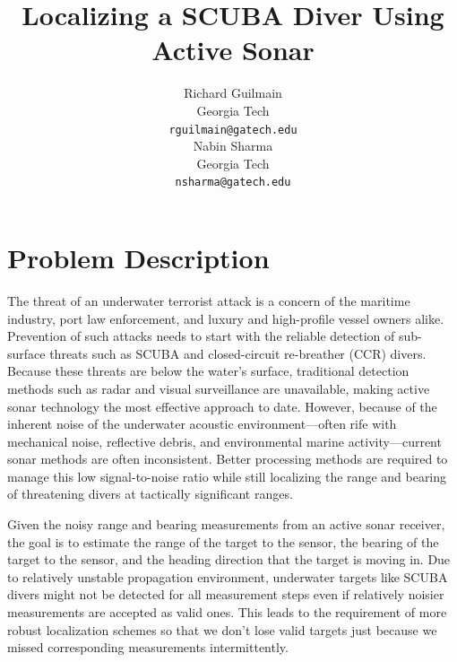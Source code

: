 \documentclass{article} %
\title{Localizing a SCUBA Diver Using Active Sonar}
\author{
Richard Guilmain \\
Georgia Tech\\
\texttt{rguilmain@gatech.edu} \\
\And
Nabin Sharma \\
Georgia Tech\\
\texttt{nsharma@gatech.edu} \\
}
\begin{document}
\maketitle


\section{Problem Description}
The threat of an underwater terrorist attack is a concern of the maritime industry,
port law enforcement, and luxury and high-profile vessel owners alike. Prevention of
such attacks needs to start with the reliable detection of sub-surface threats such
as SCUBA and closed-circuit re-breather (CCR) divers. Because these threats are below
the water’s surface, traditional detection methods such as radar and visual surveillance
are unavailable, making active sonar technology the most effective approach to date.
However, because of the inherent noise of the underwater acoustic environment—often
rife with mechanical noise, reflective debris, and environmental marine activity—current
sonar methods are often inconsistent. Better processing methods are required to manage
this low signal-to-noise ratio while still localizing the range and bearing of
threatening divers at tactically significant ranges.

Given the noisy range and bearing measurements from an active sonar receiver, the goal
is to estimate the range of the target to the sensor, the bearing of the target to the sensor,
and the heading direction that the target is moving in. Due to relatively unstable
propagation environment, underwater targets like SCUBA divers might not be detected
for all measurement steps even if relatively noisier measurements are accepted as valid
ones. This leads to the requirement of more robust localization schemes so that we don't
lose valid targets just because we missed corresponding measurements intermittently.
\end{document}

